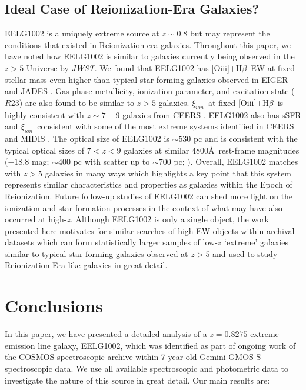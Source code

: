 \documentclass[twocolumn,tight,times,linenumbers]{aastex631}
\newcommand{\hbeta}{H$\beta$}
\newcommand{\oiii}{[O{\sc iii}]}
\newcommand{\xiion}{$\xi_{ion}$}
\begin{document}
	
		
		\subsection{Ideal Case of Reionization-Era Galaxies?}
		
		EELG1002 is a uniquely extreme source at $z \sim 0.8$ but may represent the conditions that existed in Reionization-era galaxies. Throughout this paper, we have noted how EELG1002 is similar to galaxies currently being observed in the $z > 5$ Universe by \textit{JWST}. We found that EELG1002 has \oiii+\hbeta~EW at fixed stellar mass even higher than typical star-forming galaxies observed in EIGER \citep{Matthee2023} and JADES \citep{Boyett2024}. Gas-phase metallicity, ionization parameter, and excitation state ($R23$) are also found to be similar to $z > 5$ galaxies. \xiion~at fixed \oiii+\hbeta~is highly consistent with $z \sim 7 - 9$ galaxies from CEERS \citep{Tang2023}. EELG1002 also has sSFR and \xiion~consistent with some of the most extreme systems identified in CEERS \citep{Whitler2024} and MIDIS \citep{Rinaldi2023}. The optical size of EELG1002 is $\sim 530$ pc and is consistent with the typical optical sizes of $7 < z < 9$ galaxies at similar $4800$\AA~rest-frame magnitudes ($-18.8$ mag; $\sim 400$ pc with scatter up to $\sim 700$ pc; \citealt{Yang2022_Lilan}). Overall, EELG1002 matches with $z > 5$ galaxies in many ways which highlights a key point that this system represents similar characteristics and properties as galaxies within the Epoch of Reionization. Future follow-up studies of EELG1002 can shed more light on the ionization and star formation processes in the context of what may have also occurred at high-$z$. Although EELG1002 is only a single object, the work presented here motivates for similar searches of high EW objects within archival datasets which can form statistically larger samples of low-$z$ `extreme' galaxies similar to typical star-forming galaxies observed at $z > 5$ and used to study Reionization Era-like galaxies in great detail.
	

	
		\section{Conclusions}
            \label{sec:conclusions}
		
		In this paper, we have presented a detailed analysis of a $z = 0.8275$ extreme emission line galaxy, EELG1002, which was identified as part of ongoing work of the COSMOS spectroscopic archive within 7 year old Gemini GMOS-S spectroscopic data. We use all available spectroscopic and photometric data to investigate the nature of this source in great detail. Our main results are:
		
\end{document}

